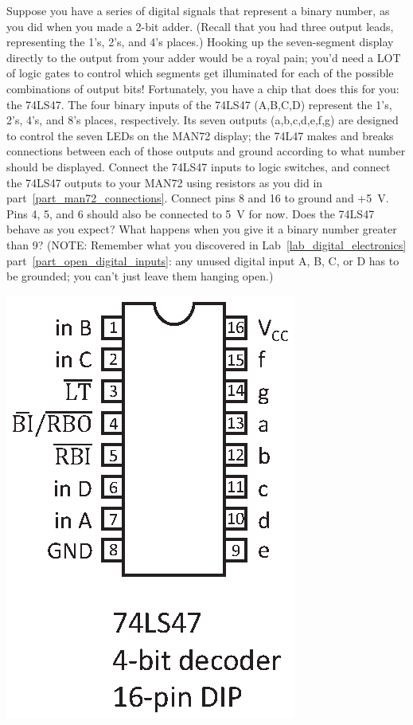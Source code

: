 \begin{enumerate}


\begin{minipage}{.70\textwidth}

\item Suppose you have a series of digital signals that represent a binary number, as you did when you made a 2-bit adder.  (Recall that you had three output leads, representing the 1's, 2's, and 4's places.) Hooking up the seven-segment display directly to the output from your adder would be a royal pain; you'd need a LOT of logic gates to control which segments get illuminated for each of the possible combinations of output bits!  Fortunately, you have a chip that does this for you: the 74LS47.  The four binary inputs of the 74LS47 (A,B,C,D) represent the 1's, 2's, 4's, and 8's places, respectively.  Its seven outputs (a,b,c,d,e,f,g) are designed to control the seven LEDs on the MAN72 display; the 74L47 makes and breaks connections between each of those outputs and ground according to what number should be displayed.  Connect the 74LS47 inputs to logic switches, and connect the 74LS47 outputs to your MAN72 using resistors as you did in part~\ref{part_man72_connections}.  Connect pins 8 and 16 to ground and +5~V.  Pins 4, 5, and 6 should also be connected to 5~V for now.   Does the 74LS47 behave as you expect?  What happens when you give it a binary number greater than 9?  (NOTE: Remember what you discovered in Lab~\ref{lab_digital_electronics} part~\ref{part_open_digital_inputs}: any unused digital input A, B, C, or D has to be grounded; you can't just leave them hanging open.)  
\end{minipage}
\begin{minipage}{.28\textwidth}
\includegraphics[scale=0.8]{appendices/pinouts/74LS47.eps}
\end{minipage}



\end{enumerate}
